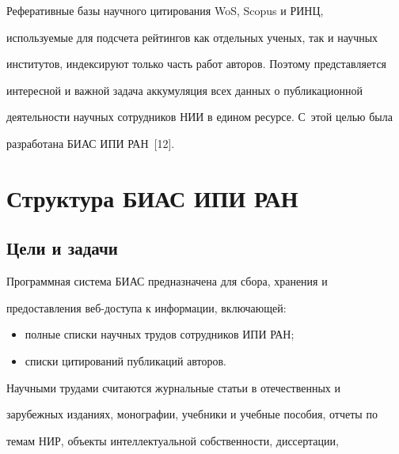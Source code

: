   Реферативные базы научного цитирования WoS, Scopus и РИНЦ,


используемые для подсчета рейтингов как отдельных ученых, так и научных


институтов, индексируют только часть работ авторов. Поэтому представляется


интересной и важной задача аккумуляция всех данных о публикационной


деятельности научных сотрудников НИИ в едином ресурсе. С~этой целью была


разработана БИАС ИПИ РАН~[12].





\section{Структура БИАС ИПИ РАН}











\subsection{Цели и задачи}











  Программная система БИАС предназначена для сбора, хранения и


предо\-став\-ле\-ния веб-до\-сту\-па к информации, включающей:


  \begin{itemize}


  \item полные списки научных трудов сотрудников ИПИ РАН;


  \item списки цитирований публикаций авторов.


  \end{itemize}





  Научными трудами считаются журнальные статьи в отечественных и


зарубежных изданиях, монографии, учебники и учебные пособия, отчеты по


темам НИР, объекты интеллектуальной собственности, диссертации,


